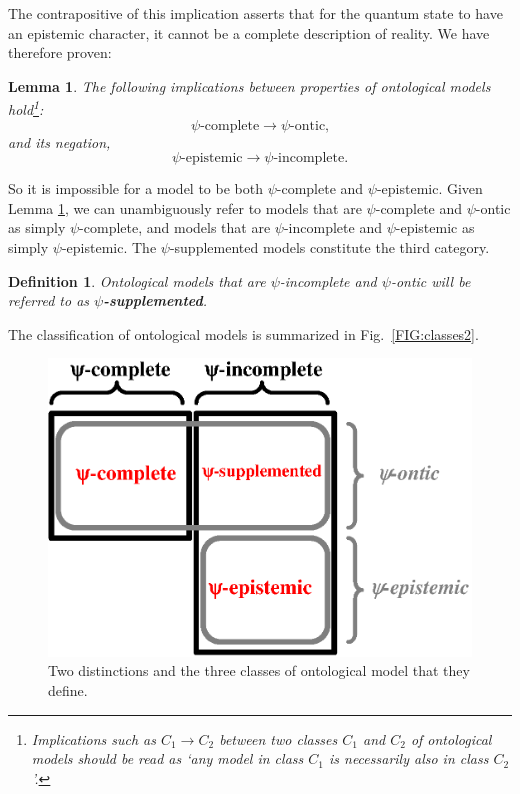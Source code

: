 \documentclass[aps,nofootinbib,12pt]{revtex4-2}
\newtheorem{definition}[theorem]{Definition}
\newtheorem{lemma}[theorem]{Lemma}
\begin{document}
The contrapositive of this implication asserts that for the quantum
state to have an epistemic character, it cannot be a complete
description of reality. We have therefore proven:

\begin{lemma}
The following implications between properties of ontological models
hold\footnote{Implications such as $C_{1}\rightarrow{C}_{2}$ between
two classes $C_{1}$ and $C_{2}$ of ontological models should be read
as `any model in class $C_{1}$ is necessarily also in class
$C_{2}$'.}:
\[
\psi\text{-complete}\rightarrow\psi\text{-ontic,}
\]
and its negation,
\begin{equation}
\psi\text{-epistemic}\rightarrow\psi\text{-incomplete.}
\end{equation}
\label{LEM:psi_ontic}
\end{lemma}

So it is impossible for a model to be both $\psi$-complete and $\psi
$-epistemic. Given Lemma \ref{LEM:psi_ontic}, we can unambiguously
refer to models that are $\psi$-complete and $\psi$-ontic as simply
$\psi$-complete, and models that are $\psi $-incomplete and
$\psi$-epistemic as simply $\psi$-epistemic. The $\psi
$-supplemented models constitute the third category.

\begin{definition}
Ontological models that are $\psi$-incomplete and $\psi$-ontic will be
referred to as \textbf{$\psi$-supplemented}.\label{DEF:psi_ontic_plus}
\end{definition}

The classification of ontological models is summarized in
Fig.~\ref{FIG:classes2}.

\begin{figure}[t]
\includegraphics[scale=0.5]{class_fig2}\caption{Two distinctions and the three
classes of ontological model that they define.}
\label{FIG:classes_chart}
\end{figure}
\end{document}
